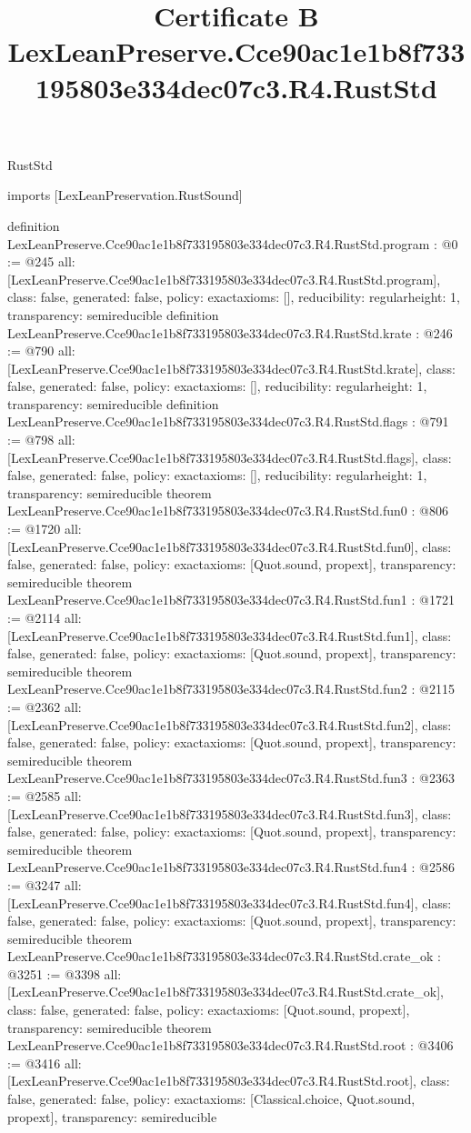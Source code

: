 \begin{lexlean}{RustStd}
\title{Certificate B LexLeanPreserve.Cce90ac1e1b8f733195803e334dec07c3.R4.RustStd}
\begin{coremodule}
imports [LexLeanPreservation.RustSound]

definition LexLeanPreserve.Cce90ac1e1b8f733195803e334dec07c3.R4.RustStd.program : @0 := @245 {
  all: [LexLeanPreserve.Cce90ac1e1b8f733195803e334dec07c3.R4.RustStd.program],
  class: false,
  generated: false,
  policy: exact{axioms: []},
  reducibility: regular{height: 1},
  transparency: semireducible
}
definition LexLeanPreserve.Cce90ac1e1b8f733195803e334dec07c3.R4.RustStd.krate : @246 := @790 {
  all: [LexLeanPreserve.Cce90ac1e1b8f733195803e334dec07c3.R4.RustStd.krate],
  class: false,
  generated: false,
  policy: exact{axioms: []},
  reducibility: regular{height: 1},
  transparency: semireducible
}
definition LexLeanPreserve.Cce90ac1e1b8f733195803e334dec07c3.R4.RustStd.flags : @791 := @798 {
  all: [LexLeanPreserve.Cce90ac1e1b8f733195803e334dec07c3.R4.RustStd.flags],
  class: false,
  generated: false,
  policy: exact{axioms: []},
  reducibility: regular{height: 1},
  transparency: semireducible
}
theorem LexLeanPreserve.Cce90ac1e1b8f733195803e334dec07c3.R4.RustStd.fun0 : @806 := @1720 {
  all: [LexLeanPreserve.Cce90ac1e1b8f733195803e334dec07c3.R4.RustStd.fun0],
  class: false,
  generated: false,
  policy: exact{axioms: [Quot.sound, propext]},
  transparency: semireducible
}
theorem LexLeanPreserve.Cce90ac1e1b8f733195803e334dec07c3.R4.RustStd.fun1 : @1721 := @2114 {
  all: [LexLeanPreserve.Cce90ac1e1b8f733195803e334dec07c3.R4.RustStd.fun1],
  class: false,
  generated: false,
  policy: exact{axioms: [Quot.sound, propext]},
  transparency: semireducible
}
theorem LexLeanPreserve.Cce90ac1e1b8f733195803e334dec07c3.R4.RustStd.fun2 : @2115 := @2362 {
  all: [LexLeanPreserve.Cce90ac1e1b8f733195803e334dec07c3.R4.RustStd.fun2],
  class: false,
  generated: false,
  policy: exact{axioms: [Quot.sound, propext]},
  transparency: semireducible
}
theorem LexLeanPreserve.Cce90ac1e1b8f733195803e334dec07c3.R4.RustStd.fun3 : @2363 := @2585 {
  all: [LexLeanPreserve.Cce90ac1e1b8f733195803e334dec07c3.R4.RustStd.fun3],
  class: false,
  generated: false,
  policy: exact{axioms: [Quot.sound, propext]},
  transparency: semireducible
}
theorem LexLeanPreserve.Cce90ac1e1b8f733195803e334dec07c3.R4.RustStd.fun4 : @2586 := @3247 {
  all: [LexLeanPreserve.Cce90ac1e1b8f733195803e334dec07c3.R4.RustStd.fun4],
  class: false,
  generated: false,
  policy: exact{axioms: [Quot.sound, propext]},
  transparency: semireducible
}
theorem LexLeanPreserve.Cce90ac1e1b8f733195803e334dec07c3.R4.RustStd.crate_ok : @3251 := @3398 {
  all: [LexLeanPreserve.Cce90ac1e1b8f733195803e334dec07c3.R4.RustStd.crate_ok],
  class: false,
  generated: false,
  policy: exact{axioms: [Quot.sound, propext]},
  transparency: semireducible
}
theorem LexLeanPreserve.Cce90ac1e1b8f733195803e334dec07c3.R4.RustStd.root : @3406 := @3416 {
  all: [LexLeanPreserve.Cce90ac1e1b8f733195803e334dec07c3.R4.RustStd.root],
  class: false,
  generated: false,
  policy: exact{axioms: [Classical.choice, Quot.sound, propext]},
  transparency: semireducible
}


\end{coremodule}
\end{lexlean}
